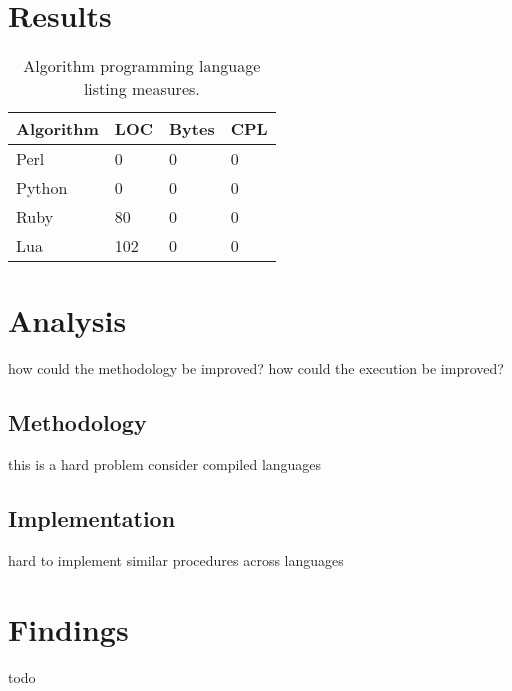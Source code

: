 \documentclass[a4paper, 11pt]{article}
\begin{document}



% 
% 
\section{Results}
\label{sec:results}

\begin{table}[ht]
	\centering
		\begin{tabularx}{\textwidth}{lXXX}
		\toprule
		\textbf{Algorithm} & \textbf{LOC} & \textbf{Bytes} & \textbf{CPL} \\ 
		\toprule
		Perl & 0 & 0 & 0 \\
		Python & 0 & 0 & 0 \\
		Ruby & 80 & 0 & 0 \\
		Lua & 102 & 0 & 0 \\
		\bottomrule
		\end{tabularx}	
	\caption{Algorithm programming language listing measures.}
	\label{tab:implementation_results}
\end{table}


% 
% 
\section{Analysis}
\label{sec:analysis}
how could the methodology be improved?
how could the execution be improved?


\subsection{Methodology}
this is a hard problem
consider compiled languages


\subsection{Implementation}
hard to implement similar procedures across languages


% 
% 
\section{Findings}
\label{sec:findings}
todo





\end{document}

